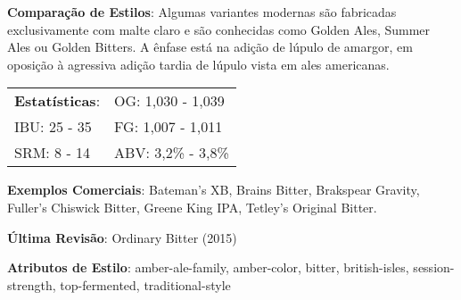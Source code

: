 \textbf{Comparação de Estilos}: Algumas variantes modernas são fabricadas exclusivamente com malte claro e são conhecidas como Golden Ales, Summer Ales ou Golden Bitters. A ênfase está na adição de lúpulo de amargor, em oposição à agressiva adição tardia de lúpulo vista em ales americanas.

\begin{tabular}{@{}p{35mm}p{35mm}@{}}
  \textbf{Estatísticas}: & OG: 1,030 - 1,039 \\
  IBU: 25 - 35  & FG: 1,007 - 1,011  \\
  SRM: 8 - 14  & ABV: 3,2\% - 3,8\%
\end{tabular}

\textbf{Exemplos Comerciais}: Bateman’s XB, Brains Bitter, Brakspear Gravity, Fuller's Chiswick Bitter, Greene King IPA, Tetley’s Original Bitter.

\textbf{Última Revisão}: Ordinary Bitter (2015)

\textbf{Atributos de Estilo}: amber-ale-family, amber-color, bitter, british-isles, session-strength, top-fermented, traditional-style
